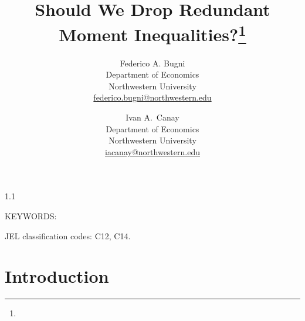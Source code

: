 \documentclass[11pt]{article}
\numberwithin{equation}{section}
\theoremstyle{definition}
\begin{document}
\author{
Federico A. Bugni \\
Department of Economics\\
Northwestern University \\
\url{federico.bugni@northwestern.edu}
\and
Ivan A.\ Canay \\
Department of Economics\\
Northwestern University\\
\url{iacanay@northwestern.edu}
}

\title{Should We Drop Redundant Moment Inequalities?\footnote{}}

\maketitle

\vspace{-1cm}
\begin{spacing}{1.1}
    \begin{abstract}
    \end{abstract}
\end{spacing}

\noindent KEYWORDS: 

\noindent JEL classification codes: C12, C14.

\thispagestyle{empty}

\newpage 

\section{Introduction}\label{sec:intro}

\end{document}
